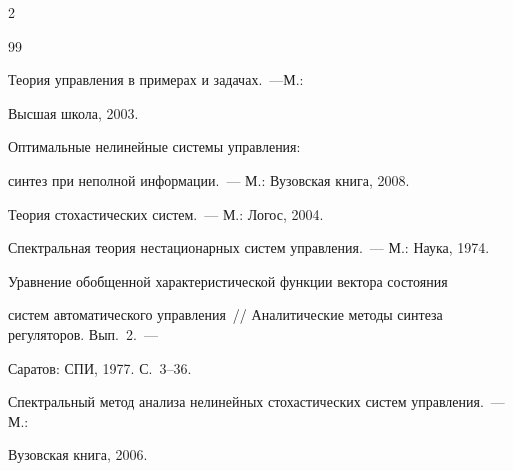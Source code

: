 \begin{multicols}{2}
{{


\begin{thebibliography}{99}







 Теория управления в примерах и задачах.~---М.: 


Высшая школа, 2003.







 Оптимальные нелинейные сис\-те\-мы управления: 


синтез при неполной информации.~--- М.: Вузовская книга, 2008.







 Теория стохастических сис\-тем.~--- М.: Логос, 2004.









Спект\-раль\-ная теория нестационарных сис\-тем управления.~--- М.: Наука, 1974.







 Уравнение обобщенной характеристической функции вектора состояния 


сис\-тем автоматического управления~// Аналитические методы синтеза регуляторов. Вып.~2.~--- 


Саратов: СПИ, 1977. С.~3--36.









Спектральный метод анализа нелинейных стохастических сис\-тем управления.~--- М.: 


Вузовская книга, 2006.










\end{thebibliography}}}
\end{multicols}
